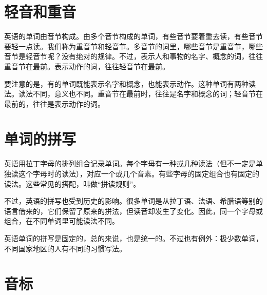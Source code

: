 \documentclass[10.5pt, a4paper]{ctexbook} %
\begin{document}
\section{轻音和重音}

英语的单词由音节构成。由多个音节构成的单词，有些音节要着重去读，有些音节要轻一点读。我们称为重音节和轻音节。多音节的词里，哪些音节是重音节，哪些音节是轻音节呢？没有绝对的规律。不过，表示人和事物的名字、概念的词，往往重音节在最前。表示动作的词，往往轻音节在最前。

要注意的是，有的单词既能表示名字和概念，也能表示动作。这种单词有两种读法。读法不同，意义也不同。重音节在最前时，往往是名字和概念的词；轻音节在最前的，往往是表示动作的词。






\section{单词的拼写}

英语用拉丁字母的排列组合记录单词。每个字母有一种或几种读法（但不一定是单独读这个字母时的读法），对应一个或几个音素。有些字母的固定组合也有固定的读法。这些常见的搭配，叫做“拼读规则”。

不过，英语的拼写也受到历史的影响。很多单词是从拉丁语、法语、希腊语等别的语言借来的，它们保留了原来的拼法，但读音却发生了变化。因此，同一个字母或组合，在不同单词里可能读法不同。

英语单词的拼写是固定的，总的来说，也是统一的。不过也有例外：极少数单词，不同国家地区的人有不同的习惯写法。

\section{音标}
\end{document}
